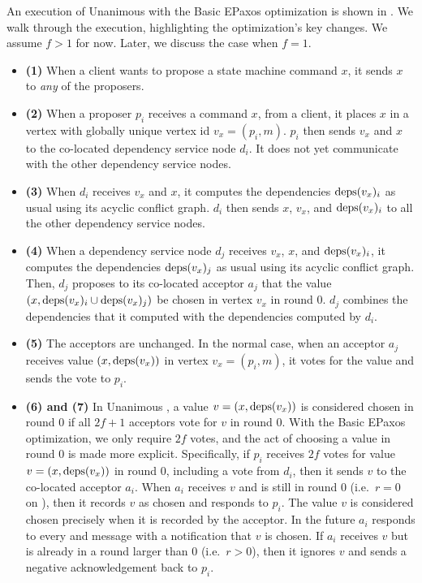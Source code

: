 An execution of Unanimous \BPaxos{} with the Basic EPaxos optimization is shown
in . We walk through the execution, highlighting the
optimization's key changes. We assume $f > 1$ for now. Later, we discuss the
case when $f = 1$.
\begin{itemize}
  \item \textbf{(1)}
    When a client wants to propose a state machine command $x$, it sends $x$ to
    \emph{any} of the proposers.

  \item \textbf{(2)}
    When a proposer $p_i$ receives a command $x$, from a client, it places $x$
    in a vertex with globally unique vertex id $v_x = (p_i, m)$.
    \change{} $p_i$ then sends $v_x$ and $x$ to the co-located dependency
    service node $d_i$. It does not yet communicate with the other dependency
    service nodes.

  \item \textbf{(3)}
    \change{} When $d_i$ receives $v_x$ and $x$, it computes the
    dependencies $\text{deps}(v_x)_i$ as usual using its acyclic conflict graph.
    $d_i$ then sends $x$, $v_x$, and $\text{deps}(v_x)_i$ to all the other dependency
    service nodes.

  \item \textbf{(4)}
    When a dependency service node $d_j$ receives $v_x$, $x$, and
    $\text{deps}(v_x)_i$, it computes the dependencies $\text{deps}(v_x)_j$ as usual using
    its acyclic conflict graph. \change{} Then, $d_j$ proposes to its
    co-located acceptor $a_j$ that the value $(x, \text{deps}(v_x)_i \cup
    \text{deps}(v_x)_j)$ be chosen in vertex $v_x$ in round $0$. $d_j$ combines the
    dependencies that it computed with the dependencies computed by $d_i$.

  \item \textbf{(5)}
    The acceptors are unchanged. In the normal case, when an acceptor $a_j$
    receives value $(x, \text{deps}(v_x))$ in vertex $v_x = (p_i, m)$, it votes for
    the value and sends the vote to $p_i$.

  \item \textbf{(6) and (7)}
    \change{} In Unanimous \BPaxos{}, a value $v = (x, \text{deps}(v_x))$ is
    considered chosen in round $0$ if all $2f+1$ acceptors vote for $v$ in
    round $0$. With the Basic EPaxos optimization, we only require $2f$ votes,
    and the act of choosing a value in round $0$ is made more explicit.
    Specifically, if $p_i$ receives $2f$ votes for value $v = (x, \text{deps}(v_x))$
    in round $0$, including a vote from $d_i$, then it sends $v$ to the
    co-located acceptor $a_i$. When $a_i$ receives $v$ and is still in round
    $0$ (i.e.\ $r = 0$ on  ),
    then it records $v$ as chosen and responds to $p_i$. The value $v$ is
    considered chosen precisely when it is recorded by the acceptor. In the
    future $a_i$ responds to every  and 
    message with a notification that $v$ is chosen. If $a_i$ receives $v$ but
    is already in a round larger than $0$ (i.e.\ $r > 0$), then it ignores $v$
    and sends a negative acknowledgement back to $p_i$.


\end{itemize}
